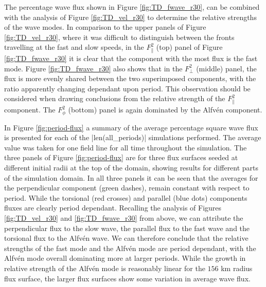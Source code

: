The percentage wave flux shown in Figure \ref{fig:TD_fwave_r30}, can be combined with the analysis of Figure \ref{fig:TD_vel_r30} to determine the relative strengths of the wave modes.
In comparison to the upper panels of Figure \ref{fig:TD_vel_r30}, where it was difficult to distinguish between the fronts travelling at the fast and slow speeds, in the $F^2_\parallel$ (top) panel of Figure \ref{fig:TD_fwave_r30} it is clear that the component with the most flux is the fast mode.
Figure \ref{fig:TD_fwave_r30} also shows that in the $F^2_\perp$ (middle) panel, the flux is more evenly shared between the two superimposed components, with the ratio apparently changing dependant upon period.
This observation should be considered when drawing conclusions from the relative strength of the $F^2_\parallel$ component.
The $F^2_\phi$ (bottom) panel is again dominated by the Alfv\'en component.

In Figure \ref{fig:period-flux} a summary of the average percentage square wave flux is presented for each of the \py|len(all_periods)| simulations performed.
The average value was taken for one field line for all time throughout the simulation.
The three panels of Figure \ref{fig:period-flux} are for three flux surfaces seeded at different initial radii at the top of the domain, showing results for different parts of the simulation domain.
In all three panels it can be seen that the averages for the perpendicular component (green dashes), remain constant with respect to period.
While the torsional (red crosses) and parallel (blue dots) components fluxes are clearly period dependant.
Recalling the analysis of Figures \ref{fig:TD_vel_r30} and \ref{fig:TD_fwave_r30} from above, we can attribute the perpendicular flux to the slow wave, the parallel flux to the fast wave and the torsional flux to the Alfv\'en wave.
We can therefore conclude that the relative strengths of the fast mode and the Alfv\'en mode are period dependant, with the Alfv\'en mode overall dominating more at larger periods.
While the growth in relative strength of the Alfv\'en mode is reasonably linear for the $156$ km radius flux surface, the larger flux surfaces show some variation in average wave flux.


